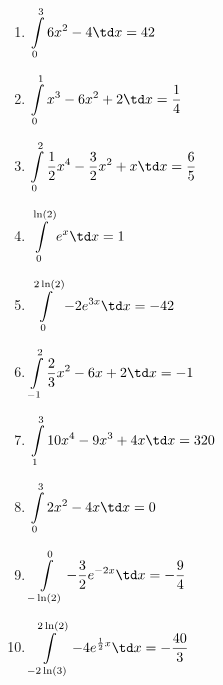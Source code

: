 \begin{Answer}[ref=integralRechnA2]
	\begin{enumerate}[label=\alph*)]
		\item \(\displaystyle\int\limits_{0}^{3} 6x^2-4 \td x=42\)
		\item \(\displaystyle\int\limits_{0}^{1} x^3-6x^2+2 \td x=\frac{1}{4}\)
		\item \(\displaystyle\int\limits_{0}^{2} \frac{1}{2}x^4-\frac{3}{2}x^2+x \td x=\frac{6}{5}\)
		\item \(\displaystyle\int\limits_{0}^{\ln(2)} e^x \td x=1\)
		\item \(\displaystyle\int\limits_{0}^{2\ln(2)} -2e^{3x} \td x=-42\)
		\item \(\displaystyle\int\limits_{-1}^{2} \frac{2}{3}x^2-6x+2 \td x=-1\)
		\item \(\displaystyle\int\limits_{1}^{3} 10x^4-9x^3+4x \td x=320\)
		\item \(\displaystyle\int\limits_{0}^{3} 2x^2-4x \td x=0\)
		\item \(\displaystyle\int\limits_{-\ln(2)}^{0} -\frac{3}{2}e^{-2x} \td x=-\frac{9}{4}\)
		\item \(\displaystyle\int\limits_{-2\ln(3)}^{2\ln(2)} -4e^{\frac{1}{2}x} \td x=-\frac{40}{3}\)
	\end{enumerate}
\end{Answer}